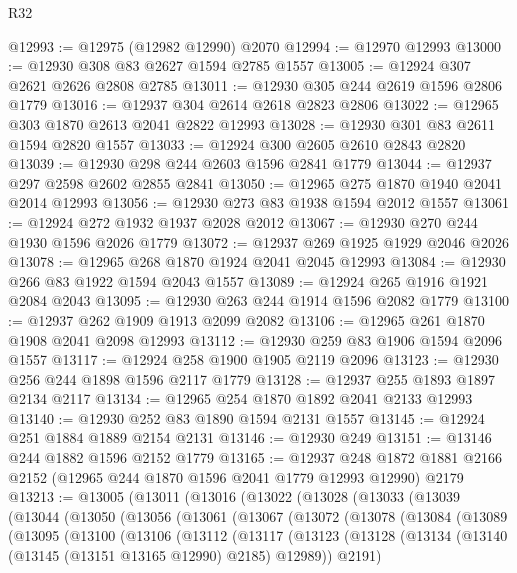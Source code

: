 \begin{lexlean}{R32}
\begin{coremodule}
@12993 := @12975 (@12982 @12990) @2070
@12994 := @12970 @12993
@13000 := @12930 @308 @83 @2627 @1594 @2785 @1557
@13005 := @12924 @307 @2621 @2626 @2808 @2785
@13011 := @12930 @305 @244 @2619 @1596 @2806 @1779
@13016 := @12937 @304 @2614 @2618 @2823 @2806
@13022 := @12965 @303 @1870 @2613 @2041 @2822 @12993
@13028 := @12930 @301 @83 @2611 @1594 @2820 @1557
@13033 := @12924 @300 @2605 @2610 @2843 @2820
@13039 := @12930 @298 @244 @2603 @1596 @2841 @1779
@13044 := @12937 @297 @2598 @2602 @2855 @2841
@13050 := @12965 @275 @1870 @1940 @2041 @2014 @12993
@13056 := @12930 @273 @83 @1938 @1594 @2012 @1557
@13061 := @12924 @272 @1932 @1937 @2028 @2012
@13067 := @12930 @270 @244 @1930 @1596 @2026 @1779
@13072 := @12937 @269 @1925 @1929 @2046 @2026
@13078 := @12965 @268 @1870 @1924 @2041 @2045 @12993
@13084 := @12930 @266 @83 @1922 @1594 @2043 @1557
@13089 := @12924 @265 @1916 @1921 @2084 @2043
@13095 := @12930 @263 @244 @1914 @1596 @2082 @1779
@13100 := @12937 @262 @1909 @1913 @2099 @2082
@13106 := @12965 @261 @1870 @1908 @2041 @2098 @12993
@13112 := @12930 @259 @83 @1906 @1594 @2096 @1557
@13117 := @12924 @258 @1900 @1905 @2119 @2096
@13123 := @12930 @256 @244 @1898 @1596 @2117 @1779
@13128 := @12937 @255 @1893 @1897 @2134 @2117
@13134 := @12965 @254 @1870 @1892 @2041 @2133 @12993
@13140 := @12930 @252 @83 @1890 @1594 @2131 @1557
@13145 := @12924 @251 @1884 @1889 @2154 @2131
@13146 := @12930 @249
@13151 := @13146 @244 @1882 @1596 @2152 @1779
@13165 := @12937
    @248
    @1872
    @1881
    @2166
    @2152
    (@12965 @244 @1870 @1596 @2041 @1779 @12993 @12990)
    @2179
@13213 := @13005
    (@13011
      (@13016
        (@13022
          (@13028
            (@13033
              (@13039
                (@13044
                  (@13050
                    (@13056
                      (@13061
                        (@13067
                          (@13072
                            (@13078
                              (@13084
                                (@13089
                                  (@13095
                                    (@13100
                                      (@13106
                                        (@13112
                                          (@13117
                                            (@13123
                                              (@13128
                                                (@13134
                                                  (@13140
                                                    (@13145 (@13151 @13165 @12990) @2185)
                                                    @12989))
                                                @2191)

\end{coremodule}
\end{lexlean}
